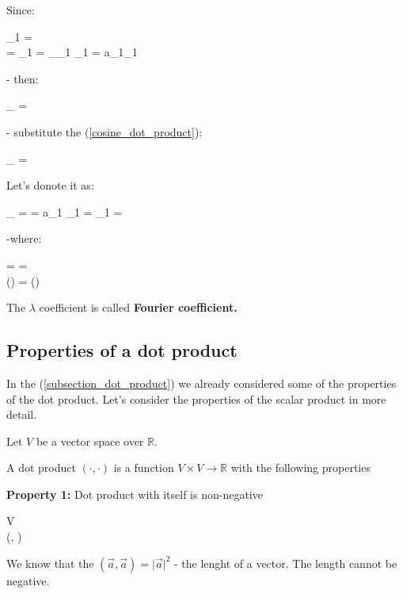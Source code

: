 \documentclass{article}
\begin{document}
Since:

\beq
{}_{1} =  \\
 = \vert {} \vert {}_{1} = _{_{1}} \cdot {}_{1} = 
a_{1}_{1}
\eeq

- then:

\beq \label{vector_projection_2}
_{}  =   
\eeq

- substitute the (\ref{cosine_dot_product}):

\beq \label{vector_projection_3}
_{}  =  
\eeq

Let's donote it as:

\beq
{}_{}  = \lambda {} = \lambda a_{1} _{1} = \lambda  \vert {} \vert {}_{1} = \lambda {}
\eeq

-where:

\beq
\lambda =  = 
\\
\cos(\varphi) = \cos()
\eeq

The $\lambda$ coefficient is called \textbf{Fourier coefficient.}





\subsection{Properties of a dot product}

In the (\ref{subsection_dot_product}) we already considered some of the properties of the dot product.
Let's consider the properties of the scalar product in more detail.

Let $V$ be a vector space over $\mathbb{R}$.

A dot product $(\cdot, \cdot)$ is a function $V \times V \rightarrow \mathbb{R}$ with the following properties


\textbf{Property 1:} Dot product with itself is non-negative

\beq \label{dot_prod_non_negative}
\forall {} \in V \\
(, ) 
\eeq


We know that the $(\vec{a}, \vec{a}) = \vert \vec{a} \vert^2$ - the lenght of a vector. The length cannot be negative. 
\end{document}
